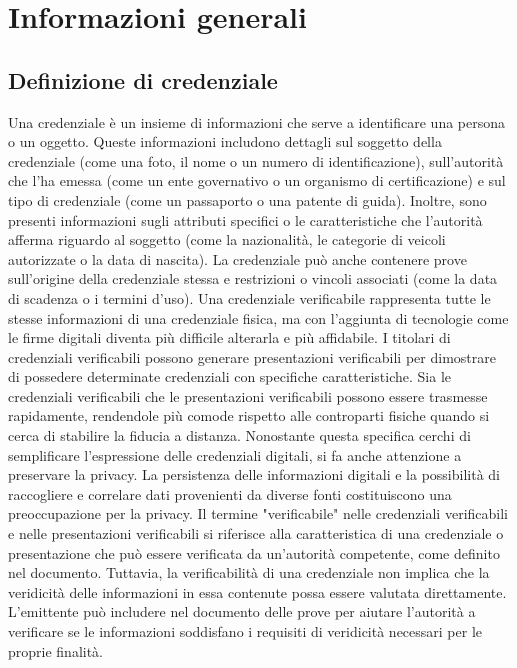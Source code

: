 \section{Informazioni generali}
\subsection{Definizione di credenziale}
Una credenziale è un insieme di informazioni che serve a identificare una persona o un oggetto. Queste informazioni includono dettagli sul soggetto della credenziale (come una foto, il nome o un numero di identificazione), sull'autorità che l'ha emessa (come un ente governativo o un organismo di certificazione) e sul tipo di credenziale (come un passaporto o una patente di guida). Inoltre, sono presenti informazioni sugli attributi specifici o le caratteristiche che l'autorità afferma riguardo al soggetto (come la nazionalità, le 
categorie di veicoli autorizzate o la data di nascita). La credenziale può anche contenere prove sull'origine della credenziale stessa e restrizioni o vincoli associati (come la data 
di scadenza o i termini d'uso).
Una credenziale verificabile rappresenta tutte le stesse informazioni di una credenziale fisica, ma con l'aggiunta di tecnologie come le firme digitali diventa più difficile alterarla
 e più affidabile. I titolari di credenziali verificabili possono generare presentazioni verificabili per dimostrare di possedere determinate credenziali con specifiche caratteristiche. 
Sia le credenziali verificabili che le presentazioni verificabili possono essere trasmesse rapidamente, rendendole più comode rispetto alle controparti fisiche quando si cerca di 
stabilire la fiducia a distanza.
Nonostante questa specifica cerchi di semplificare l'espressione delle credenziali digitali, si fa anche attenzione a preservare la privacy. La persistenza delle informazioni 
digitali e la possibilità di raccogliere e correlare dati provenienti da diverse fonti costituiscono una preoccupazione per la privacy.
Il termine "verificabile" nelle credenziali verificabili e nelle presentazioni verificabili si riferisce alla caratteristica di una credenziale o presentazione che può essere 
verificata da un'autorità competente, come definito nel documento. Tuttavia, la verificabilità di una credenziale non implica che la veridicità delle informazioni in essa 
contenute possa essere valutata direttamente. L'emittente può includere nel documento delle prove per aiutare l'autorità a verificare se le informazioni soddisfano i requisiti 
di veridicità necessari per le proprie finalità.


